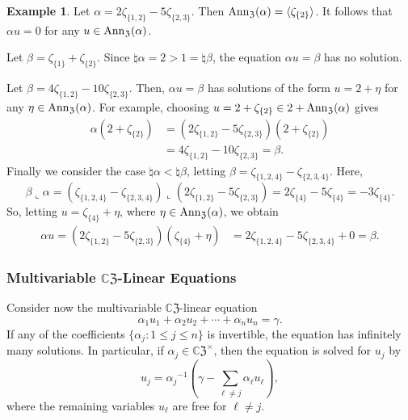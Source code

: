 \documentclass{article}
\theoremstyle{definition}
\newtheorem{example}[theorem]{Example}
\newcommand{\CZ}{\mathbb{C}\mathfrak{Z}}
\newcommand{\Z}{\mathfrak{Z}}
\newcommand{\Ann}{{\rm Ann}_\Z}
\numberwithin{equation}{section}
\begin{document}
\begin{example}
Let $\alpha=2\zeta_{\{1,2\}}-5\zeta_{\{2,3\}}$.  Then $\Ann(\alpha)=\langle \zeta_{\{2\}}\rangle$.  It follows that $\alpha u=0$ for any $u\in\Ann(\alpha)$.

Let $\beta=\zeta_{\{1\}}+\zeta_{\{2\}}$.  Since $\natural\alpha=2>1=\natural \beta$, the equation $\alpha u=\beta$ has no solution.

Let $\beta=4\zeta_{\{1,2\}}-10\zeta_{\{2,3\}}$.  Then, $\alpha u=\beta$ has solutions of the form $u=2+\eta$ for any $\eta\in\Ann(\alpha)$.  For example, choosing $u=2+\zeta_{\{2\}}\in 2+\Ann(\alpha)$ gives \begin{align*}
\alpha(2+\zeta_{\{2\}})&=(2\zeta_{\{1,2\}}-5\zeta_{\{2,3\}})(2+\zeta_{\{2\}})\\
&=4\zeta_{\{1,2\}}-10\zeta_{\{2,3\}}=\beta.
\end{align*}
Finally we consider the case $\natural\alpha<\natural\beta$, letting $\beta=\zeta_{\{1,2,4\}}-\zeta_{\{2,3,4\}}$.  Here, \begin{equation*}
\beta\llcorner\alpha=(\zeta_{\{1,2,4\}}-\zeta_{\{2,3,4\}})\llcorner(2\zeta_{\{1,2\}}-5\zeta_{\{2,3\}})=2\zeta_{\{4\}}-5\zeta_{\{4\}}=-3\zeta_{\{4\}}.
\end{equation*}
So, letting $u=\zeta_{\{4\}}+\eta$, where $\eta\in\Ann(\alpha)$, we obtain\begin{align*}
\alpha u = (2\zeta_{\{1,2\}}-5\zeta_{\{2,3\}})(\zeta_{\{4\}}+\eta)&=
2\zeta_{\{1,2,4\}}-5\zeta_{\{2,3,4\}}+0=\beta.
\end{align*}
\end{example}

\subsubsection*{Multivariable $\CZ$-Linear Equations}


Consider now the multivariable $\CZ$-linear equation \begin{equation*}
\alpha_1 u_1+\alpha_2 u_2+\cdots+ \alpha_n u_n=\gamma.
\end{equation*}
If any of the coefficients $\{\alpha_j: 1\le j\le n\}$ is invertible, the equation has infinitely many solutions.  In particular, if $\alpha_j\in\CZ^\times$, then the equation is solved for $u_j$ by \begin{equation*}
u_j={\alpha_j}^{-1}\left(\gamma-\sum_{\ell\ne j}\alpha_\ell u_\ell\right),
\end{equation*}
where the remaining variables $u_\ell$ are free for $\ell\ne j$.  
\end{document}
